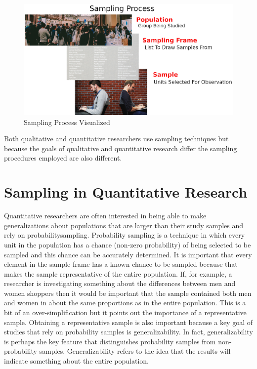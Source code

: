 \begin{figure}[H]
	\centering
	\includegraphics[width=\maxwidth{.95\linewidth}]{gfx/07-11}
	\caption{Sampling Process Visualized}
	\label{07:fig11}
\end{figure}

Both qualitative and quantitative researchers use sampling techniques but because the goals of qualitative and quantitative research differ the sampling procedures employed are also different.

\section{Sampling in Quantitative Research}

Quantitative researchers are often interested in being able to make generalizations about populations that are larger than their study samples and rely on \gls{probabilitysampling}. Probability sampling is a technique in which every unit in the population has a chance (non-zero probability) of being selected to be sampled and this chance can be accurately determined. It is important that every element in the sample frame has a known chance to be sampled because that makes the sample representative of the entire population. If, for example, a researcher is investigating something about the differences between men and women shoppers then it would be important that the sample contained both men and women in about the same proportions as in the entire population. This is a bit of an over-simplification but it points out the importance of a representative sample. Obtaining a representative sample is also important because a key goal of studies that rely on probability samples is generalizability. In fact, generalizability is perhaps the key feature that distinguishes probability samples from non-probability samples. Generalizability refers to the idea that the results will indicate something about the entire population.

